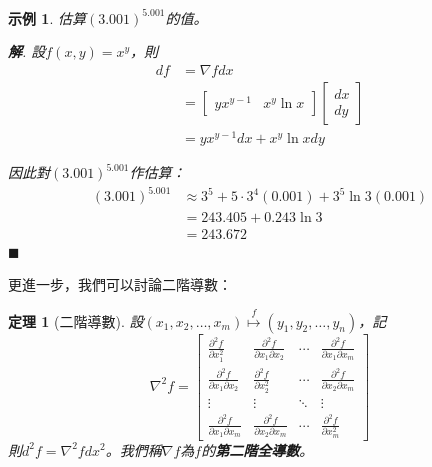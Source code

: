 \documentclass[12pt]{article}
\newtheorem*{theorem}{定理}
\newtheorem*{example}{示例}
\newenvironment*{sol}{\par \textbf{解}.}{\hfill$\blacksquare$}
\begin{document}
    \begin{example}
        估算$(3.001)^{5.001}$的值。

        \begin{sol}
            設$f(x,y)=x^y$，則\begin{align*}
                df&=\nabla f dx\\
                &=\begin{bmatrix}
                    yx^{y-1}&x^y\ln{x}
                \end{bmatrix}\begin{bmatrix}
                    dx\\dy
                \end{bmatrix}\\
                &=yx^{y-1}dx+x^y\ln{x}dy
            \end{align*}

            因此對$(3.001)^{5.001}$作估算：\begin{align*}
                (3.001)^{5.001}&\approx 3^5+5\cdot 3^4 (0.001)+3^5\ln{3} (0.001)\\
                &=243.405+0.243\ln{3}\\
                &=243.672
            \end{align*}
        \end{sol}
    \end{example}

    更進一步，我們可以討論二階導數：

    \begin{theorem}[二階導數]
        設$(x_1,x_2,\dots,x_m)\overset{f}{\mapsto}(y_1,y_2,\dots,y_n)$，記$$\nabla^2 f=\begin{bmatrix}
            \frac{\partial^2 f}{\partial x_1^2}&\frac{\partial^2 f}{\partial x_1 \partial x_2}&\cdots&\frac{\partial^2 f}{\partial x_1 \partial x_m}\\
            \frac{\partial^2 f}{\partial x_1 \partial x_2}&\frac{\partial^2 f}{\partial x_2^2}&\cdots&\frac{\partial^2 f}{\partial x_2 \partial x_m}\\
            \vdots&\vdots&\ddots&\vdots\\
            \frac{\partial^2 f}{\partial x_1 \partial x_m}&\frac{\partial^2 f}{\partial x_2 \partial x_m}&\cdots&\frac{\partial^2 f}{\partial x_m^2}
        \end{bmatrix}$$
        則$d^2f=\nabla^2 f dx^2$。我們稱$\nabla f$為$f$的\textbf{第二階全導數}。
    \end{theorem}
\end{document}
